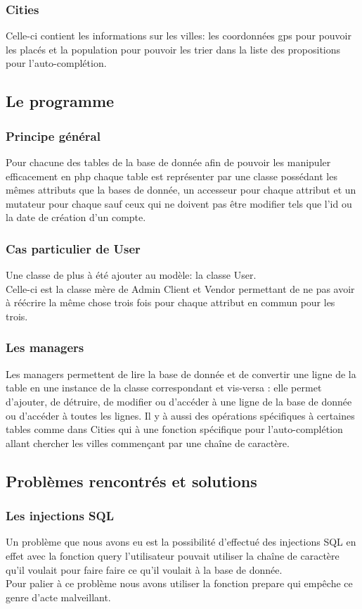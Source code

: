 \documentclass{article}
\begin{document}
		\subsubsection{Cities}
			Celle-ci contient les informations sur les villes: les coordonnées gps pour pouvoir les placés et la population pour pouvoir les trier dans la liste des propositions pour l’auto-complétion.
	\subsection{Le programme}
		\subsubsection{Principe général}
			Pour chacune des tables de la base de donnée afin de pouvoir les manipuler efficacement en php chaque table est représenter par une classe possédant les mêmes attributs que la bases de donnée, un accesseur pour chaque attribut et un mutateur pour chaque sauf ceux qui ne doivent pas être modifier tels que l'id ou la date de création d'un compte.
		\subsubsection{Cas particulier de User}
			Une classe de plus à été ajouter au modèle: la classe User.\\ Celle-ci est la classe mère de Admin Client et Vendor permettant de ne pas avoir à réécrire la même chose trois fois pour chaque attribut en commun pour les trois.
		\subsubsection{Les managers}
			Les managers permettent de lire la base de donnée et de convertir une ligne de la table en une instance de la classe correspondant et vis-versa : elle permet d'ajouter, de détruire, de modifier ou d'accéder à une ligne de la base de donnée ou d'accéder à toutes les lignes. Il y à aussi des opérations spécifiques à certaines tables comme dans Cities qui à une fonction spécifique pour l'auto-complétion allant chercher les villes commençant par une chaîne de caractère.
	\subsection{Problèmes rencontrés et solutions}
		\subsubsection{Les injections SQL}
			Un problème que nous avons eu est la possibilité d'effectué des injections SQL en effet avec la fonction query l'utilisateur pouvait utiliser la chaîne de caractère qu'il voulait pour faire faire ce qu'il voulait à la base de donnée.\\ Pour palier à ce problème nous avons utiliser la fonction prepare qui empêche ce genre d'acte malveillant.
\end{document}
